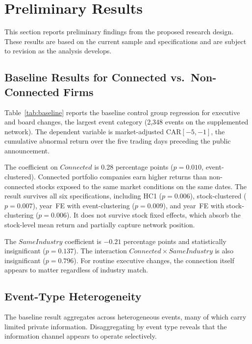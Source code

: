 \section{Preliminary Results}
\label{sec:results}

This section reports preliminary findings from the proposed research design. These results are based on the current sample and specifications and are subject to revision as the analysis develops.

\subsection{Baseline Results for Connected vs.\ Non-Connected Firms}



Table~\ref{tab:baseline} reports the baseline control group regression for executive and board changes, the largest event category (2,348 events on the supplemented network). The dependent variable is market-adjusted CAR$[-5,-1]$, the cumulative abnormal return over the five trading days preceding the public announcement.

The coefficient on $Connected$ is 0.28 percentage points ($p=0.010$, event-clustered). Connected portfolio companies earn higher returns than non-connected stocks exposed to the same market conditions on the same dates. The result survives all six specifications, including HC1 ($p=0.006$), stock-clustered ($p=0.007$), year~FE with event-clustering ($p=0.009$), and year~FE with stock-clustering ($p=0.006$). It does not survive stock fixed effects, which absorb the stock-level mean return and partially capture network position.

The $SameIndustry$ coefficient is $-0.21$ percentage points and statistically insignificant ($p=0.137$). The interaction $Connected \times SameIndustry$ is also insignificant ($p=0.796$). For routine executive changes, the connection itself appears to matter regardless of industry match.

\subsection{Event-Type Heterogeneity}



The baseline result aggregates across heterogeneous events, many of which carry limited private information. Disaggregating by event type reveals that the information channel appears to operate selectively.


